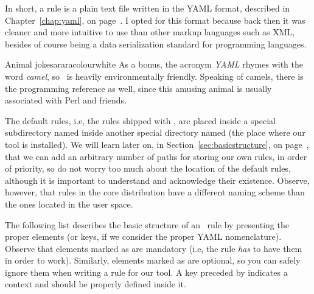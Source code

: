 In short, a rule is a plain text file written in the YAML format, described in Chapter~\ref{chap:yaml}, on page~\pageref{chap:yaml}. I opted for this format because back then it was cleaner and more intuitive to use than other markup languages such as XML, besides of course being a data serialization standard for programming languages.

\begin{messagebox}{Animal jokes}{araracolour}{\icok}{white}
As a bonus, the acronym \emph{YAML} rhymes with the word \emph{camel}, so \arara\ is heavily environmentally friendly. Speaking of camels, there is the programming reference as well, since this amusing animal is usually associated with Perl and friends.
\end{messagebox}

The default rules, i.e, the rules shipped with \arara, are placed inside a special subdirectory named  inside another special directory named  (the place where our tool is installed). We will learn later on, in Section~\ref{sec:basicstructure}, on page~\pageref{sec:basicstructure}, that we can add an arbitrary number of paths for storing our own rules, in order of priority, so do not worry too much about the location of the default rules, although it is important to understand and acknowledge their existence. Observe, however, that rules in the core distribution have a different naming scheme than the ones located in the user space.

The following list describes the basic structure of an \arara\ rule by presenting the proper elements (or keys, if we consider the proper YAML nomenclature). Observe that elements marked as  are mandatory (i.e, the rule \emph{has} to have them in order to work). Similarly, elements marked as  are optional, so you can safely ignore them when writing a rule for our tool. A key preceded by  indicates a context and should be properly defined inside it.

